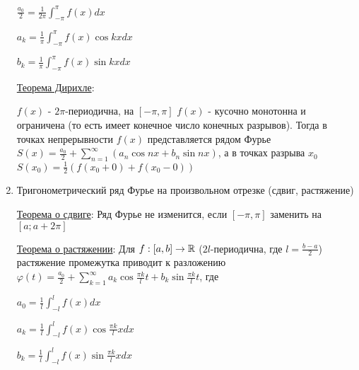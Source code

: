 \documentclass[12pt]{article}
\begin{document}
\begin{enumerate}
    $\frac{a_0}{2} = \frac{1}{2\pi} \int_{-\pi}^\pi f(x) dx$ 
    
    $a_k = \frac{1}{\pi} \int_{-\pi}^\pi f(x) \cos kx dx$
    
    $b_k = \frac{1}{\pi} \int_{-\pi}^\pi f(x) \sin kx dx$

    \hyperlink{dirichletstheorem}{Теорема Дирихле}:

    \Ths $f(x)$ - $2\pi$-периодична, на $[-\pi, \pi]$ $f(x)$ - кусочно монотонна и ограничена (то есть имеет конечное число конечных разрывов). 
    Тогда в точках непрерывности $f(x)$ представляется рядом Фурье $S(x) = \frac{a_0}{2} + \sum_{n = 1}^\infty (a_n \cos nx + b_n \sin nx)$,
    а в точках разрыва $x_0$ $S(x_0) = \frac{1}{2} (f(x_0 + 0) + f(x_0 - 0))$

    \item Тригонометрический ряд Фурье на произвольном отрезке (сдвиг, растяжение)

    \hyperlink{shifttheorem}{Теорема о сдвиге}:  Ряд Фурье не изменится, если $[-\pi, \pi]$ заменить на $[a; a + 2\pi]$

    \hyperlink{stretchingtheorem}{Теорема о растяжении}:  Для $f : [a, b] \to \mathbb{R}$ ($2l$-периодична, где $l = \frac{b - a}{2}$) растяжение промежутка приводит к разложению
    $\varphi(t) = \frac{a_0}{2} + \sum_{k = 1}^\infty a_k \cos \frac{\pi k}{l} t + b_k \sin \frac{\pi k}{l} t$, где

    $a_0 = \frac{1}{l} \int_{-l}^l f(x) dx$

    $a_k = \frac{1}{l} \int_{-l}^l f(x) \cos \frac{\pi k}{l} x dx$

    $b_k = \frac{1}{l} \int_{-l}^l f(x) \sin \frac{\pi k}{l} x dx$

    

\end{enumerate}
\end{document}

